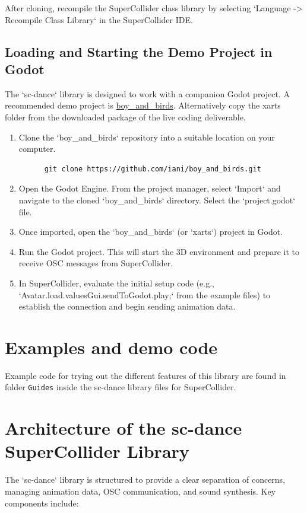 \documentclass[11pt]{article}
\begin{document}
After cloning, recompile the SuperCollider class library by selecting `Language -> Recompile Class Library` in the SuperCollider IDE.
\subsection{Loading and Starting the Demo Project in Godot}
\label{sec:org9882329}

The `sc-dance` library is designed to work with a companion Godot project. A recommended demo project is \href{https://github.com/iani/boy\_and\_birds}{boy\_and\_birds}. Alternatively copy the xarts folder from the downloaded package of the live coding deliverable.

\begin{enumerate}
\item Clone the `boy\_and\_birds` repository into a suitable location on your computer.

\begin{verbatim}
      git clone https://github.com/iani/boy_and_birds.git
\end{verbatim}

\item Open the Godot Engine. From the project manager, select `Import` and navigate to the cloned `boy\_and\_birds` directory. Select the `project.godot` file.

\item Once imported, open the `boy\_and\_birds` (or `xarts`) project in Godot.

\item Run the Godot project. This will start the 3D environment and prepare it to receive OSC messages from SuperCollider.

\item In SuperCollider, evaluate the initial setup code (e.g., `Avatar.load.valuesGui.sendToGodot.play;` from the example files) to establish the connection and begin sending animation data.
\end{enumerate}
\section{Examples and demo code}
\label{sec:org8259958}

Example code for trying out the different features of this library are found in folder \texttt{Guides} inside the sc-dance library files for SuperCollider.
\section{Architecture of the sc-dance SuperCollider Library}
\label{sec:org1e7dbb1}
The `sc-dance` library is structured to provide a clear separation of concerns, managing animation data, OSC communication, and sound synthesis. Key components include:
\end{document}
